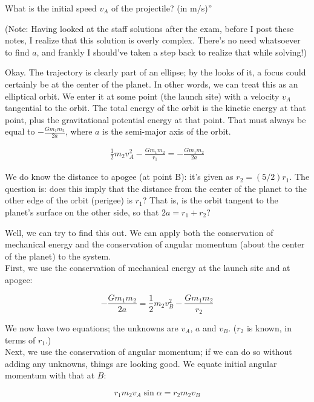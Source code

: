\documentclass[8.01x]{subfiles}
\begin{document}
What is the initial speed $v_A$ of the projectile? (in m/s)''

(Note: Having looked at the staff solutions after the exam, before I post these notes, I realize that this solution is overly complex. There's no need whatsoever to find $a$, and frankly I should've taken a step back to realize that while solving!)

Okay. The trajectory is clearly part of an ellipse; by the looks of it, a focus could certainly be at the center of the planet. In other words, we can treat this as an elliptical orbit. We enter it at some point (the launch site) with a velocity $v_A$ tangential to the orbit. The total energy of the orbit is the kinetic energy at that point, plus the gravitational potential energy at that point. That must always be equal to $\displaystyle -\frac{G m_1 m_2}{2a}$, where $a$ is the semi-major axis of the orbit.

\begin{align}
\frac{1}{2} m_2 v_A^2 - \frac{G m_1 m_2}{r_1} = -\frac{G m_1 m_2}{2a}
\end{align}

We do know the distance to apogee (at point B): it's given as $r_2 = (5/2) r_1$. The question is: does this imply that the distance from the center of the planet to the other edge of the orbit (perigee) is $r_1$? That is, is the orbit tangent to the planet's surface on the other side, so that $2a = r_1 + r_2$?

Well, we can try to find this out. We can apply both the conservation of mechanical energy and the conservation of angular momentum (about the center of the planet) to the system.\\
First, we use the conservation of mechanical energy at the launch site and at apogee:

\begin{equation}
-\frac{G m_1 m_2}{2a} = \frac{1}{2} m_2 v_B^2 - \frac{G m_1 m_2}{r_2}
\end{equation}

We now have two equations; the unknowns are $v_A$, $a$ and $v_B$. ($r_2$ is known, in terms of $r_1$.)\\
Next, we use the conservation of angular momentum; if we can do so without adding any unknowns, things are looking good. We equate initial angular momentum with that at $B$:

\begin{equation}
r_1 m_2 v_A \sin \alpha = r_2 m_2 v_B
\end{equation}
\end{document}
